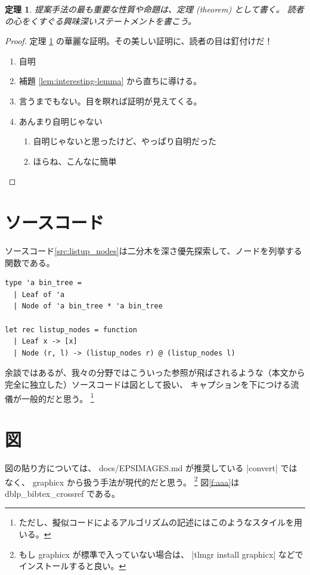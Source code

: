 \documentclass[uplatex]{sumiilab-paper}
\theoremstyle{mystyle}
\newtheorem{theorem}[definition]{定理}
\numberwithin{definition}{chapter} %
\begin{document}
\begin{theorem}
  \label{thm:wonderful-theorem}
  提案手法の最も重要な性質や命題は、定理 (theorem) として書く。
  読者の心をくすぐる興味深いステートメントを書こう。
\end{theorem}

\begin{proof}
  定理 \ref{thm:wonderful-theorem} の華麗な証明。その美しい証明に、読者の目は釘付けだ！
  \begin{enumerate}[leftmargin=0pt,itemindent=*,label=Case \arabic*.]
  \item 自明
  \item 補題 \ref{lem:interesting-lemma} から直ちに導ける。
  \item 言うまでもない。目を瞑れば証明が見えてくる。
  \item あんまり自明じゃない
    \begin{enumerate}[label=(\roman*)]
    \item 自明じゃないと思ったけど、やっぱり自明だった
    \item ほらね、こんなに簡単
    \end{enumerate}
  \end{enumerate}
\end{proof}

\section{ソースコード}

ソースコード\ref{src:listup_nodes}は二分木を深さ優先探索して、ノードを列挙する関数である。
\begin{lstlisting}[caption=二分木のノードのリストアップ,label=src:listup_nodes]
type 'a bin_tree =
  | Leaf of 'a
  | Node of 'a bin_tree * 'a bin_tree

let rec listup_nodes = function
  | Leaf x -> [x]
  | Node (r, l) -> (listup_nodes r) @ (listup_nodes l)
\end{lstlisting}

余談ではあるが、我々の分野ではこういった参照が飛ばされるような（本文から完全に独立した）ソースコードは図として扱い、
キャプションを下につける流儀が一般的だと思う。
\footnote{ただし、擬似コードによるアルゴリズムの記述にはこのようなスタイルを用いる。}


\section{図}

図の貼り方については、 docs/EPSIMAGES.md が推奨している |convert| ではなく、 graphicx から扱う手法が現代的だと思う。
\footnote{
もし graphicx が標準で入っていない場合は、 |tlmgr install graphicx| などでインストールすると良い。
}
図\ref{f:aaa}は dblp\_bibtex\_crossref である。
\end{document}
